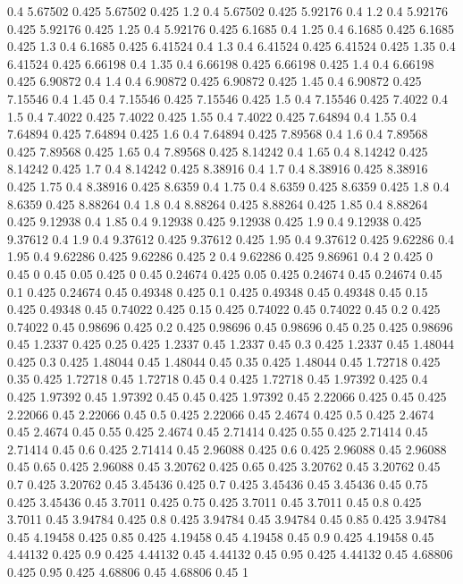 0.4 5.67502
0.425 5.67502
0.425 1.2
0.4 5.67502
0.425 5.92176
0.4 1.2
0.4 5.92176
0.425 5.92176
0.425 1.25
0.4 5.92176
0.425 6.1685
0.4 1.25
0.4 6.1685
0.425 6.1685
0.425 1.3
0.4 6.1685
0.425 6.41524
0.4 1.3
0.4 6.41524
0.425 6.41524
0.425 1.35
0.4 6.41524
0.425 6.66198
0.4 1.35
0.4 6.66198
0.425 6.66198
0.425 1.4
0.4 6.66198
0.425 6.90872
0.4 1.4
0.4 6.90872
0.425 6.90872
0.425 1.45
0.4 6.90872
0.425 7.15546
0.4 1.45
0.4 7.15546
0.425 7.15546
0.425 1.5
0.4 7.15546
0.425 7.4022
0.4 1.5
0.4 7.4022
0.425 7.4022
0.425 1.55
0.4 7.4022
0.425 7.64894
0.4 1.55
0.4 7.64894
0.425 7.64894
0.425 1.6
0.4 7.64894
0.425 7.89568
0.4 1.6
0.4 7.89568
0.425 7.89568
0.425 1.65
0.4 7.89568
0.425 8.14242
0.4 1.65
0.4 8.14242
0.425 8.14242
0.425 1.7
0.4 8.14242
0.425 8.38916
0.4 1.7
0.4 8.38916
0.425 8.38916
0.425 1.75
0.4 8.38916
0.425 8.6359
0.4 1.75
0.4 8.6359
0.425 8.6359
0.425 1.8
0.4 8.6359
0.425 8.88264
0.4 1.8
0.4 8.88264
0.425 8.88264
0.425 1.85
0.4 8.88264
0.425 9.12938
0.4 1.85
0.4 9.12938
0.425 9.12938
0.425 1.9
0.4 9.12938
0.425 9.37612
0.4 1.9
0.4 9.37612
0.425 9.37612
0.425 1.95
0.4 9.37612
0.425 9.62286
0.4 1.95
0.4 9.62286
0.425 9.62286
0.425 2
0.4 9.62286
0.425 9.86961
0.4 2
0.425 0
0.45 0
0.45 0.05
0.425 0
0.45 0.24674
0.425 0.05
0.425 0.24674
0.45 0.24674
0.45 0.1
0.425 0.24674
0.45 0.49348
0.425 0.1
0.425 0.49348
0.45 0.49348
0.45 0.15
0.425 0.49348
0.45 0.74022
0.425 0.15
0.425 0.74022
0.45 0.74022
0.45 0.2
0.425 0.74022
0.45 0.98696
0.425 0.2
0.425 0.98696
0.45 0.98696
0.45 0.25
0.425 0.98696
0.45 1.2337
0.425 0.25
0.425 1.2337
0.45 1.2337
0.45 0.3
0.425 1.2337
0.45 1.48044
0.425 0.3
0.425 1.48044
0.45 1.48044
0.45 0.35
0.425 1.48044
0.45 1.72718
0.425 0.35
0.425 1.72718
0.45 1.72718
0.45 0.4
0.425 1.72718
0.45 1.97392
0.425 0.4
0.425 1.97392
0.45 1.97392
0.45 0.45
0.425 1.97392
0.45 2.22066
0.425 0.45
0.425 2.22066
0.45 2.22066
0.45 0.5
0.425 2.22066
0.45 2.4674
0.425 0.5
0.425 2.4674
0.45 2.4674
0.45 0.55
0.425 2.4674
0.45 2.71414
0.425 0.55
0.425 2.71414
0.45 2.71414
0.45 0.6
0.425 2.71414
0.45 2.96088
0.425 0.6
0.425 2.96088
0.45 2.96088
0.45 0.65
0.425 2.96088
0.45 3.20762
0.425 0.65
0.425 3.20762
0.45 3.20762
0.45 0.7
0.425 3.20762
0.45 3.45436
0.425 0.7
0.425 3.45436
0.45 3.45436
0.45 0.75
0.425 3.45436
0.45 3.7011
0.425 0.75
0.425 3.7011
0.45 3.7011
0.45 0.8
0.425 3.7011
0.45 3.94784
0.425 0.8
0.425 3.94784
0.45 3.94784
0.45 0.85
0.425 3.94784
0.45 4.19458
0.425 0.85
0.425 4.19458
0.45 4.19458
0.45 0.9
0.425 4.19458
0.45 4.44132
0.425 0.9
0.425 4.44132
0.45 4.44132
0.45 0.95
0.425 4.44132
0.45 4.68806
0.425 0.95
0.425 4.68806
0.45 4.68806
0.45 1
